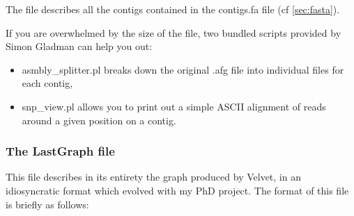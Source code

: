 \documentclass{article}
\begin{document}
The file describes all the contigs contained in the contigs.fa file (cf \ref{sec:fasta}). 

If you are overwhelmed by the size of the file, two bundled scripts provided by Simon Gladman can help you out:
\begin{itemize}
\item asmbly\_splitter.pl breaks down the  original .afg file into individual files for each contig,
\item snp\_view.pl allows you to print out a simple ASCII alignment of reads around a given position on a contig.
\end{itemize}

\subsubsection{The LastGraph file}

This file describes in its entirety the graph produced by Velvet, in an idiosyncratic format which evolved with my PhD project. The format of this file is briefly as follows:
\end{document}
